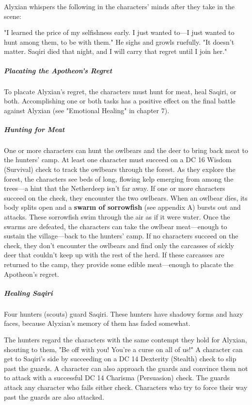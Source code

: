 \documentclass[10pt,a4paper,twoside,bg=print,twocolumn,openany,nodeprecatedcode]{dndbook}
\begin{document}
Alyxian whispers the following in the characters' minds after they take in the scene:

\begin{DndReadAloud}{}
"I learned the price of my selfishness early. I just wanted to—I just wanted to hunt among them, to be with them." He sighs and growls ruefully. "It doesn't matter. Saqiri died that night, and I will carry that regret until I join her."

\end{DndReadAloud}

\subparagraph{Placating the Apotheon's Regret}
To placate Alyxian's regret, the characters must hunt for meat, heal Saqiri, or both. Accomplishing one or both tasks has a positive effect on the final battle against Alyxian (see "Emotional Healing" in chapter 7).

\subparagraph{Hunting for Meat}
One or more characters can hunt the owlbears and the deer to bring back meat to the hunters' camp. At least one character must succeed on a DC 16 Wisdom (Survival) check to track the owlbears through the forest. As they explore the forest, the characters see beds of long, flowing kelp emerging from among the trees—a hint that the Netherdeep isn't far away. If one or more characters succeed on the check, they encounter the two owlbears. When an owlbear dies, its body splits open and a \textbf{swarm of sorrowfish} (see appendix A) bursts out and attacks. These sorrowfish swim through the air as if it were water. Once the swarms are defeated, the characters can take the owlbear meat—enough to sustain the village—back to the hunters' camp. If no characters succeed on the check, they don't encounter the owlbears and find only the carcasses of sickly deer that couldn't keep up with the rest of the herd. If these carcasses are returned to the camp, they provide some edible meat—enough to placate the Apotheon's regret.

\subparagraph{Healing Saqiri}
Four hunters (scouts) guard Saqiri. These hunters have shadowy forms and hazy faces, because Alyxian's memory of them has faded somewhat.

The hunters regard the characters with the same contempt they hold for Alyxian, shouting to them, "Be off with you! You're a curse on all of us!" A character can get to Saqiri's side by succeeding on a DC 14 Dexterity (Stealth) check to slip past the guards. A character can also approach the guards and convince them not to attack with a successful DC 14 Charisma (Persuasion) check. The guards attack any character who fails either check. Characters who try to force their way past the guards are also attacked.
\end{document}
